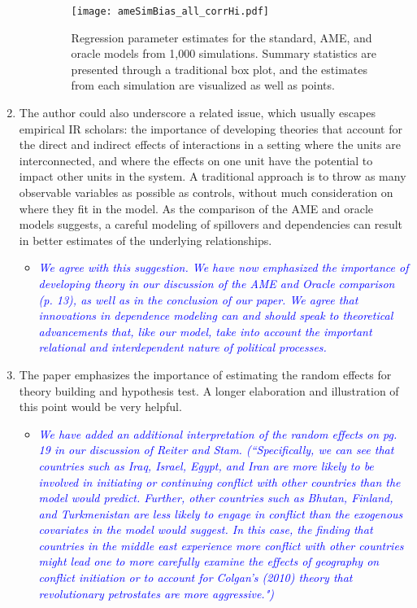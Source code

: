 \begin{enumerate}
\begin{itemize}
{{		\begin{figure}[ht]
		\caption{Regression parameter estimates for the standard, AME, and oracle models from 1,000 simulations. Summary statistics are presented through a traditional box plot, and the estimates from each simulation are visualized as well as points.}
		\label{fig:ameBias}
		\texttt{[image: ameSimBias\_all\_corrHi.pdf]} \\
		\end{figure}
		}}
	\end{itemize}
	\item The author could also underscore a related issue, which usually escapes empirical IR scholars: the importance of developing theories that account for the direct and indirect effects of interactions in a setting where the units are interconnected, and where the effects on one unit have the potential to impact other units in the system. A traditional approach is to throw as many observable variables as possible as controls, without much consideration on where they fit in the model. As the comparison of the AME and oracle models suggests, a careful modeling of spillovers and dependencies can result in better estimates of the underlying relationships.
	\begin{itemize}
		\item \textcolor{blue}{ \emph{
		We agree with this suggestion. We have now emphasized the importance of developing theory in our discussion of the AME and Oracle comparison (p. 13), as well as in the conclusion of our paper. We agree that innovations in dependence modeling can and should speak to theoretical advancements that, like our model, take into account the important relational and interdependent nature of political processes.
		}}
	\end{itemize}
	\item The paper emphasizes the importance of estimating the random effects for theory building and hypothesis test. A longer elaboration and illustration of this point would be very helpful.
	\begin{itemize}
		\item \textcolor{blue}{ \emph{
		We have added an additional interpretation of the random effects on pg. 19 in our discussion of Reiter and Stam. (``Specifically, we can see that countries such as Iraq, Israel, Egypt, and Iran are more likely to be involved in initiating or continuing conflict with other countries than the model would predict. Further, other countries such as Bhutan, Finland, and Turkmenistan are less likely to engage in conflict than the exogenous covariates in the model would suggest. In this case, the finding that countries in the middle east experience more conflict with other countries might lead one to more carefully examine the effects of geography on conflict initiation or to account for Colgan's (2010) theory that revolutionary petrostates are more aggressive.")
}}
\end{itemize}
\end{enumerate}
